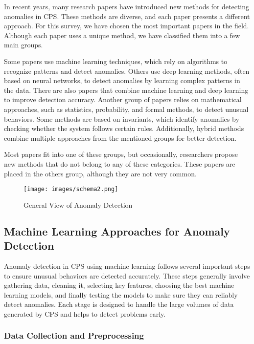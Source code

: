 In recent years, many research papers have introduced new methods for detecting anomalies in CPS. These methods are diverse, and each paper presents a different approach. For this survey, we have chosen the most important papers in the field. Although each paper uses a unique method, we have classified them into a few main groups.

Some papers use machine learning techniques, which rely on algorithms to recognize patterns and detect anomalies. Others use deep learning methods, often based on neural networks, to detect anomalies by learning complex patterns in the data. There are also papers that combine machine learning and deep learning to improve detection accuracy. Another group of papers relies on mathematical approaches, such as statistics, probability, and formal methods, to detect unusual behaviors. Some methods are based on invariants, which identify anomalies by checking whether the system follows certain rules. Additionally, hybrid methods combine multiple approaches from the mentioned groups for better detection.

Most papers fit into one of these groups, but occasionally, researchers propose new methods that do not belong to any of these categories. These papers are placed in the others group, although they are not very common.

\begin{figure*}
    \centering
    \texttt{[image: images/schema2.png]}
    \caption{General View of Anomaly Detection}
    \label{fig:general-view}
\end{figure*}
\subsection{Machine Learning Approaches for Anomaly Detection}

Anomaly detection in CPS using machine learning follows several important steps to ensure unusual behaviors are detected accurately. These steps generally involve gathering data, cleaning it, selecting key features, choosing the best machine learning models, and finally testing the models to make sure they can reliably detect anomalies. Each stage is designed to handle the large volumes of data generated by CPS and helps to detect problems early.

\subsubsection{Data Collection and Preprocessing}

